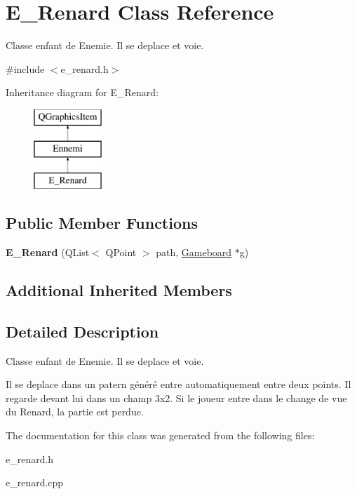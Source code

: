 \hypertarget{class_e___renard}{}\section{E\+\_\+\+Renard Class Reference}
\label{class_e___renard}


Classe enfant de Enemie. Il se deplace et voie.  




{\ttfamily \#include $<$e\+\_\+renard.\+h$>$}

Inheritance diagram for E\+\_\+\+Renard\+:\begin{figure}[H]
\begin{center}
\leavevmode
\includegraphics[height=3.000000cm]{class_e___renard}
\end{center}
\end{figure}
\subsection*{Public Member Functions}
\begin{DoxyCompactItemize}
\item 
\hypertarget{class_e___renard_aa5c7e87d02089ed76c306a3434133645}{}{\bfseries E\+\_\+\+Renard} (Q\+List$<$ Q\+Point $>$ path, \hyperlink{class_gameboard}{Gameboard} $\ast$g)\label{class_e___renard_aa5c7e87d02089ed76c306a3434133645}

\end{DoxyCompactItemize}
\subsection*{Additional Inherited Members}


\subsection{Detailed Description}
Classe enfant de Enemie. Il se deplace et voie. 

Il se deplace dans un patern généré entre automatiquement entre deux points. Il regarde devant lui dans un champ 3x2. Si le joueur entre dans le change de vue du Renard, la partie est perdue. 

The documentation for this class was generated from the following files\+:\begin{DoxyCompactItemize}
\item 
e\+\_\+renard.\+h\item 
e\+\_\+renard.\+cpp\end{DoxyCompactItemize}
